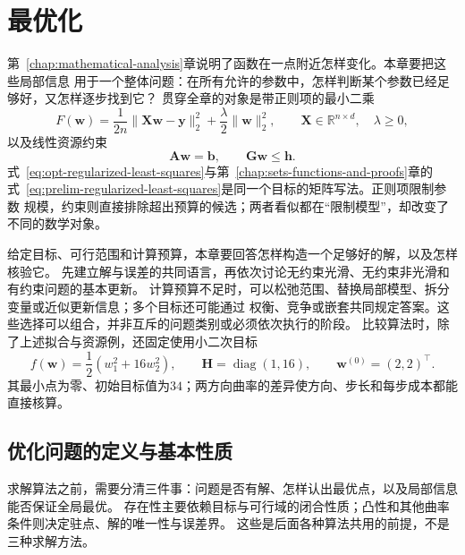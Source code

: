\chapter{最优化}
\label{chap:optimization}

第~\ref{chap:mathematical-analysis}章说明了函数在一点附近怎样变化。本章要把这些局部信息
用于一个整体问题：在所有允许的参数中，怎样判断某个参数已经足够好，又怎样逐步找到它？
贯穿全章的对象是带正则项的最小二乘
\begin{equation}
  F(\bm{w})
  =
  \frac{1}{2n}\lVert \bm{X}\bm{w}-\bm{y}\rVert_2^2
  +\frac{\lambda}{2}\lVert\bm{w}\rVert_2^2,
  \qquad
  \bm{X}\in\mathbb{R}^{n\times d},\quad \lambda\geq 0,
  \label{eq:opt-regularized-least-squares}
\end{equation}
以及线性资源约束
\begin{equation}
  \bm{A}\bm{w}=\bm{b},\qquad
  \bm{G}\bm{w}\leq\bm{h}.
  \label{eq:opt-linear-resource-constraints}
\end{equation}
式~\eqref{eq:opt-regularized-least-squares}与第~\ref{chap:sets-functions-and-proofs}章的
式~\eqref{eq:prelim-regularized-least-squares}是同一个目标的矩阵写法。正则项限制参数
规模，约束则直接排除超出预算的候选；两者看似都在“限制模型”，却改变了不同的数学对象。

给定目标、可行范围和计算预算，本章要回答怎样构造一个足够好的解，以及怎样核验它。
先建立解与误差的共同语言，再依次讨论无约束光滑、无约束非光滑和有约束问题的基本更新。
计算预算不足时，可以松弛范围、替换局部模型、拆分变量或近似更新信息；多个目标还可能通过
权衡、竞争或嵌套共同规定答案。这些选择可以组合，并非互斥的问题类别或必须依次执行的阶段。
比较算法时，除了上述拟合与资源例，还固定使用小二次目标
\begin{equation}
 f(\bm w)=\frac12(w_1^2+16w_2^2),\qquad
 \bm H=\operatorname{diag}(1,16),\qquad
 \bm w^{(0)}=(2,2)^\top.
 \label{eq:opt-common-quadratic}
\end{equation}
其最小点为零、初始目标值为$34$；两方向曲率的差异使方向、步长和每步成本都能直接核算。

\section{优化问题的定义与基本性质}
\label{sec:opt-objectives-solutions-curvature}

求解算法之前，需要分清三件事：问题是否有解、怎样认出最优点，以及局部信息能否保证全局最优。
存在性主要依赖目标与可行域的闭合性质；凸性和其他曲率条件则决定驻点、解的唯一性与误差界。
这些是后面各种算法共用的前提，不是三种求解方法。

